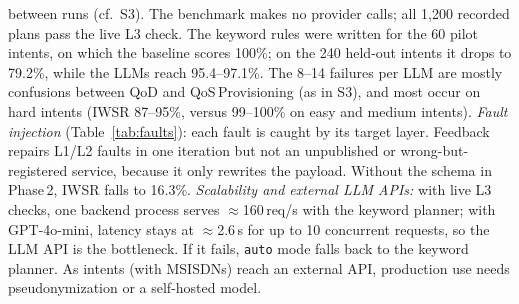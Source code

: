 \documentclass[conference]{IEEEtran}
\begin{document}
between runs (cf.\ S3). The benchmark makes no provider calls; all 1,200 recorded plans
pass the live L3 check. The keyword rules were written for the 60 pilot intents, on which
the baseline scores 100\%; on the 240 held-out intents it drops to 79.2\%, while the LLMs
reach 95.4--97.1\%. The 8--14 failures per LLM are mostly confusions between QoD and
QoS\,Provisioning (as in S3), and most occur on hard intents (IWSR 87--95\%, versus
99--100\% on easy and medium intents).
\textit{Fault injection} (Table~\ref{tab:faults}): each fault is caught by its target
layer. Feedback repairs L1/L2 faults in one iteration but not an unpublished or
wrong-but-registered service, because it only rewrites the payload.
Without the schema in Phase\,2, IWSR falls to 16.3\%.
\textit{Scalability and external LLM APIs:} with live L3 checks, one backend process
serves $\approx$160\,req/s with the keyword planner; with GPT-4o-mini, latency stays at
$\approx$2.6\,s for up to 10 concurrent requests, so the LLM API is the bottleneck. If it
fails, \texttt{auto} mode falls
back to the keyword planner. As intents (with MSISDNs) reach an external API, production
use needs pseudonymization or a self-hosted model.
\end{document}
